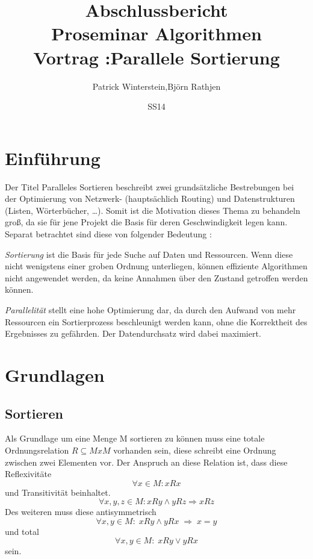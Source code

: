 \documentclass[11pt,ngerman]{article}
\title{Abschlussbericht\\Proseminar Algorithmen\\Vortrag :Parallele Sortierung}
\author{Patrick Winterstein,Björn Rathjen}
\date{SS14}
\begin{document}
\maketitle
\newpage
\tableofcontents
\newpage
\listoffigures
\listoftables
\section{Einführung}
Der Titel Paralleles Sortieren beschreibt zwei grundsätzliche Bestrebungen bei der Optimierung von Netzwerk- (hauptsächlich Routing) und Datenstrukturen (Listen, Wörterbücher, \dots). Somit ist die Motivation dieses Thema zu behandeln groß, da sie für jene Projekt die Basis für deren Geschwindigkeit legen kann. Separat betrachtet sind diese von folgender Bedeutung :

\emph{Sortierung} ist die Basis für jede Suche auf Daten und Ressourcen. Wenn diese nicht wenigstens einer groben Ordnung unterliegen, können effiziente Algorithmen nicht angewendet werden, da keine Annahmen über den Zustand getroffen werden können.

\emph{Parallelität} stellt eine hohe Optimierung dar, da durch den Aufwand von mehr Ressourcen ein Sortierprozess beschleunigt werden kann, ohne die Korrektheit des Ergebnisses zu gefährden. Der Datendurchsatz wird dabei maximiert.

\section{Grundlagen}

\subsection{Sortieren}
Als Grundlage um eine Menge M sortieren zu können muss eine totale Ordnungsrelation $R \subseteq MxM$ vorhanden sein, diese schreibt eine Ordnung zwischen zwei Elementen vor. 
Der Anspruch an diese Relation ist, dass diese Reflexivitäte 
\begin{equation}
\forall x \in M : x R x
\end{equation}
und Transitivität beinhaltet.
\begin{equation}
\forall x,y,z \in M : xRy \wedge yRz \Rightarrow xRz
\label{eq:transit}
\end{equation}
Des weiteren muss diese antisymmetrisch 
\begin{equation}
\forall x,y \in M :\; xRy \wedge yRx \; \Rightarrow \; x = y
\end{equation}
und total 
\begin{equation}
\forall x,y \in M : \; xRy \vee yRx
\end{equation}
sein.
\end{document}
